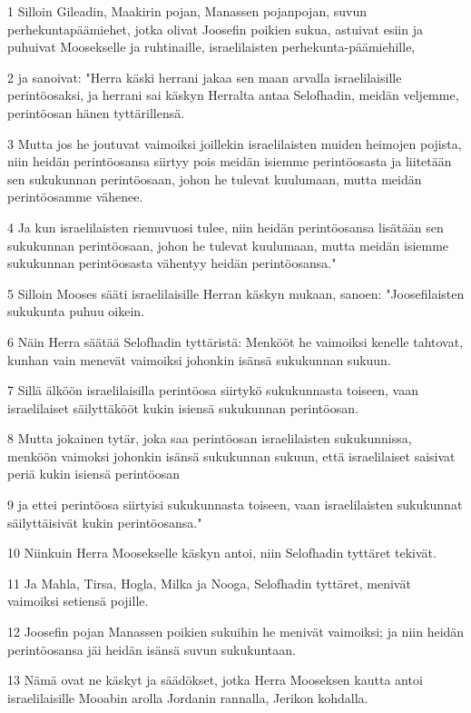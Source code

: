 \par 1 Silloin Gileadin, Maakirin pojan, Manassen pojanpojan, suvun perhekuntapäämiehet, jotka olivat Joosefin poikien sukua, astuivat esiin ja puhuivat Moosekselle ja ruhtinaille, israelilaisten perhekunta-päämiehille,
\par 2 ja sanoivat: "Herra käski herrani jakaa sen maan arvalla israelilaisille perintöosaksi, ja herrani sai käskyn Herralta antaa Selofhadin, meidän veljemme, perintöosan hänen tyttärillensä.
\par 3 Mutta jos he joutuvat vaimoiksi joillekin israelilaisten muiden heimojen pojista, niin heidän perintöosansa siirtyy pois meidän isiemme perintöosasta ja liitetään sen sukukunnan perintöosaan, johon he tulevat kuulumaan, mutta meidän perintöosamme vähenee.
\par 4 Ja kun israelilaisten riemuvuosi tulee, niin heidän perintöosansa lisätään sen sukukunnan perintöosaan, johon he tulevat kuulumaan, mutta meidän isiemme sukukunnan perintöosasta vähentyy heidän perintöosansa."
\par 5 Silloin Mooses sääti israelilaisille Herran käskyn mukaan, sanoen: "Joosefilaisten sukukunta puhuu oikein.
\par 6 Näin Herra säätää Selofhadin tyttäristä: Menkööt he vaimoiksi kenelle tahtovat, kunhan vain menevät vaimoiksi johonkin isänsä sukukunnan sukuun.
\par 7 Sillä älköön israelilaisilla perintöosa siirtykö sukukunnasta toiseen, vaan israelilaiset säilyttäkööt kukin isiensä sukukunnan perintöosan.
\par 8 Mutta jokainen tytär, joka saa perintöosan israelilaisten sukukunnissa, menköön vaimoksi johonkin isänsä sukukunnan sukuun, että israelilaiset saisivat periä kukin isiensä perintöosan
\par 9 ja ettei perintöosa siirtyisi sukukunnasta toiseen, vaan israelilaisten sukukunnat säilyttäisivät kukin perintöosansa."
\par 10 Niinkuin Herra Moosekselle käskyn antoi, niin Selofhadin tyttäret tekivät.
\par 11 Ja Mahla, Tirsa, Hogla, Milka ja Nooga, Selofhadin tyttäret, menivät vaimoiksi setiensä pojille.
\par 12 Joosefin pojan Manassen poikien sukuihin he menivät vaimoiksi; ja niin heidän perintöosansa jäi heidän isänsä suvun sukukuntaan.
\par 13 Nämä ovat ne käskyt ja säädökset, jotka Herra Mooseksen kautta antoi israelilaisille Mooabin arolla Jordanin rannalla, Jerikon kohdalla.


